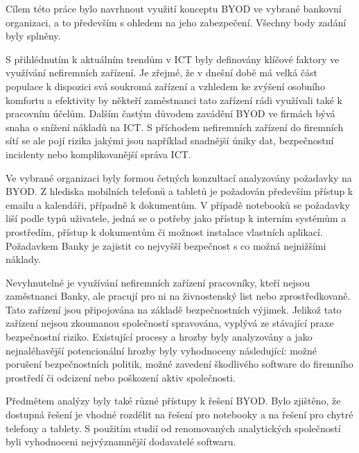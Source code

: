 Cílem této práce bylo navrhnout využití konceptu BYOD ve vybrané bankovní organizaci, a to především s ohledem na jeho zabezpečení. Všechny body zadání byly splněny.

S přihlédnutím k aktuálním trendům v ICT byly definovány klíčové faktory ve využívání nefiremních zařízení. Je zřejmé, že v dnešní době má velká část populace k dispozici svá soukromá zařízení a vzhledem ke zvýšení osobního komfortu a efektivity by někteří zaměstnanci tato zařízení rádi využívali také k pracovním účelům. Dalším častým důvodem zavádění BYOD ve firmách bývá snaha o snížení nákladů na ICT. S příchodem nefiremních zařízení do firemních sítí se ale pojí rizika jakými jsou například snadnější úniky dat, bezpečnostní incidenty nebo komplikovanější správa ICT.


Ve vybrané organizaci byly formou četných konzultací analyzovány požadavky na BYOD. Z hlediska mobilních telefonů a tabletů je požadován především přístup k emailu a kalendáři, případně k dokumentům. V případě notebooků se požadavky liší podle typů uživatele, jedná se o potřeby jako přístup k interním systémům a prostředím, přístup k dokumentům či možnost instalace vlastních aplikací. Požadavkem Banky je zajistit co nejvyšší bezpečnost s co možná nejnižšími náklady.


Nevyhnutelné je využívání nefiremních zařízení pracovníky, kteří nejsou zaměstnanci Banky, ale pracují pro ni na živnostenský list nebo zprostředkovaně. Tato zařízení jsou připojována na základě bezpečnostních výjimek. Jelikož tato zařízení nejsou zkoumanou společností spravována, vyplývá ze stávající praxe bezpečnostní riziko. Existující procesy a hrozby byly analyzovány a jako nejnaléhavější potencionální hrozby byly vyhodnoceny následující: možné porušení bezpečnostních politik, možné zavedení škodlivého software do firemního prostředí či odcizení nebo poškození aktiv společnosti.


Předmětem analýzy byly také různé přístupy k řešení BYOD. Bylo zjištěno, že dostupná řešení je vhodné rozdělit na řešení pro notebooky a na řešení pro chytré telefony a tablety. S použitím studií od renomovaných analytických společností byli vyhodnoceni nejvýznamnější dodavatelé softwaru.


